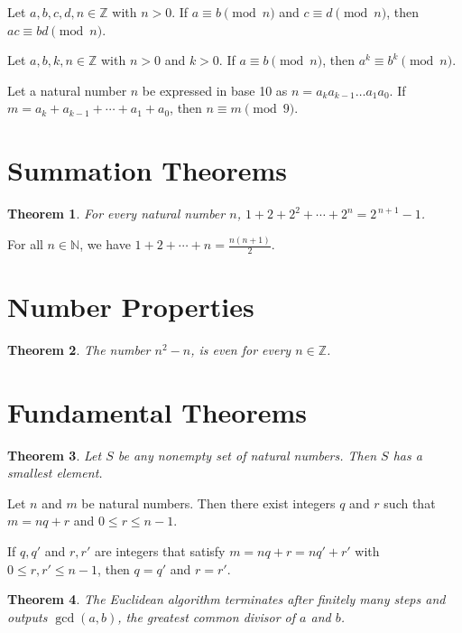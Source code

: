 \documentclass{article}
\newtheorem*{theorem*}{Theorem}
\theoremstyle{definition}
\newenvironment{manualtheorem}[1]{%
  \renewcommand{\thetheorem}{#1}%
  \theorem%
}{%
  \endtheorem%
}
\begin{document}
\begin{manualtheorem}{1.14}
Let $a, b, c, d, n \in \mathbb{Z}$ with $n > 0$. If $a \equiv b \pmod{n}$ and $c \equiv d \pmod{n}$, then $ac \equiv bd \pmod{n}$.
\end{manualtheorem}

\begin{manualtheorem}{1.18}
Let $a, b, k, n \in \mathbb{Z}$ with $n > 0$ and $k > 0$. If $a \equiv b \pmod{n}$, then $a^k \equiv b^k \pmod{n}$.
\end{manualtheorem}

\begin{manualtheorem}{1.21}
Let a natural number $n$ be expressed in base 10 as $n = a_ka_{k-1}\ldots a_1a_0$. If $m = a_k + a_{k-1} + \cdots + a_1 + a_0$, then $n \equiv m \pmod{9}$.
\end{manualtheorem}

\section{Summation Theorems}

\begin{theorem*}
For every natural number $n$, $1 + 2 + 2^{2} + \cdots + 2^{n} = 2^{\,n+1}-1$.
\end{theorem*}

\begin{manualtheorem}{A.1}
For all $n \in \mathbb{N}$, we have $1 + 2 + \cdots + n = \frac{n(n+1)}{2}$.
\end{manualtheorem}

\section{Number Properties}

\begin{theorem*}
The number $n^2 - n$, is even for every $n \in \mathbb{Z}$.
\end{theorem*}

\section{Fundamental Theorems}

\begin{theorem*}
Let $S$ be any nonempty set of natural numbers. Then $S$ has a smallest element.
\end{theorem*}

\begin{manualtheorem}{1.26}
Let $n$ and $m$ be natural numbers. Then there exist integers $q$ and $r$ such that $m = nq + r$ and $0 \leq r \leq n - 1$.
\end{manualtheorem}

\begin{manualtheorem}{1.27}
If $q, q'$ and $r, r'$ are integers that satisfy $m = nq + r = nq' + r'$ with $0 \leq r, r' \leq n - 1$, then $q = q'$ and $r = r'$.
\end{manualtheorem}

\begin{theorem*}
The Euclidean algorithm terminates after finitely many steps and outputs $\gcd(a, b)$, the greatest common divisor of $a$ and $b$.
\end{theorem*}
\end{document}
